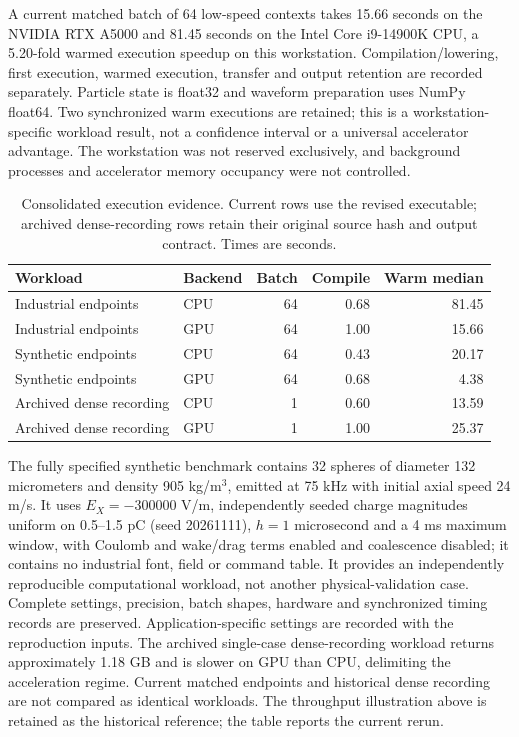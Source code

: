 A current matched batch of 64 low-speed contexts takes 15.66 seconds on the NVIDIA RTX A5000 and 81.45 seconds on the Intel Core i9-14900K CPU, a 5.20-fold warmed execution speedup on this workstation. Compilation/lowering, first execution, warmed execution, transfer and output retention are recorded separately. Particle state is float32 and waveform preparation uses NumPy float64. Two synchronized warm executions are retained; this is a workstation-specific workload result, not a confidence interval or a universal accelerator advantage. The workstation was not reserved exclusively, and background processes and accelerator memory occupancy were not controlled.

\begin{table}[htbp]\centering\small\caption{Consolidated execution evidence. Current rows use the revised executable; archived dense-recording rows retain their original source hash and output contract. Times are seconds.}\label{tab:benchmarks}\begin{tabular}{llrrr}\toprule Workload & Backend & Batch & Compile & Warm median\\\midrule
Industrial endpoints & CPU & 64 & 0.68 & 81.45 \\
Industrial endpoints & GPU & 64 & 1.00 & 15.66 \\
Synthetic endpoints & CPU & 64 & 0.43 & 20.17 \\
Synthetic endpoints & GPU & 64 & 0.68 & 4.38 \\
Archived dense recording & CPU & 1 & 0.60 & 13.59 \\
Archived dense recording & GPU & 1 & 1.00 & 25.37 \\
\bottomrule\end{tabular}\end{table}
The fully specified synthetic benchmark contains 32 spheres of diameter 132 micrometers and density 905 kg/m$^3$, emitted at 75 kHz with initial axial speed 24 m/s. It uses $E_X=-300000$ V/m, independently seeded charge magnitudes uniform on 0.5--1.5 pC (seed 20261111), $h=1$ microsecond and a 4 ms maximum window, with Coulomb and wake/drag terms enabled and coalescence disabled; it contains no industrial font, field or command table. It provides an independently reproducible computational workload, not another physical-validation case. Complete settings, precision, batch shapes, hardware and synchronized timing records are preserved. Application-specific settings are recorded with the reproduction inputs. The archived single-case dense-recording workload returns approximately 1.18 GB and is slower on GPU than CPU, delimiting the acceleration regime. Current matched endpoints and historical dense recording are not compared as identical workloads. The throughput illustration above is retained as the historical reference; the table reports the current rerun.

